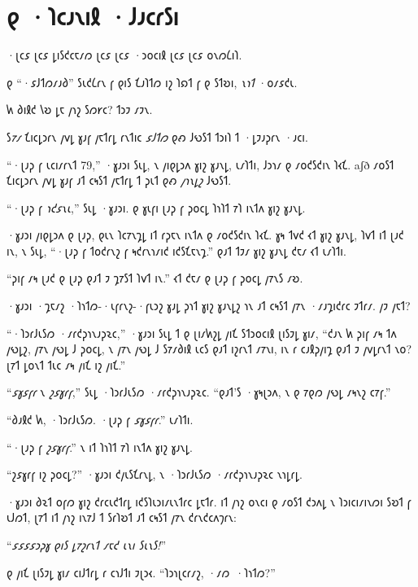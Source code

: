 \chapter{𐑞 ·𐑐𐑤𐑨𐑯𐑦𐑙 ·𐑓𐑨𐑤𐑩𐑕𐑦}

\begin{chapterOpeningAuthorNote}
    ·𐑚𐑤𐑭 𐑚𐑤𐑭 𐑛𐑦𐑕𐑒𐑤𐑱𐑥𐑼 𐑚𐑤𐑭 𐑚𐑤𐑭 ·𐑮𐑴𐑤𐑦𐑙 𐑚𐑤𐑭 𐑚𐑤𐑭 𐑴𐑯𐑼𐑖𐑦𐑐.

    𐑞 “·𐑭𐑓𐑑𐑼𐑥𐑨𐑔” 𐑕𐑧𐑒𐑖𐑩𐑯 𐑝 𐑞𐑦𐑕 𐑗𐑨𐑐𐑑𐑼 𐑦𐑟 𐑐𐑸𐑑 𐑝 𐑞 𐑕𐑑𐑹𐑦, \emph{𐑯𐑪𐑑} ·𐑴𐑥𐑭𐑒𐑧.
\end{chapterOpeningAuthorNote}
\begin{chapterOpeningQuote}
    𐑿 𐑔𐑦𐑙𐑒 𐑘𐑹 𐑛𐑱 𐑢𐑪𐑟 𐑕𐑼𐑾𐑤? 𐑑𐑮𐑲 𐑥𐑲𐑯.
\end{chapterOpeningQuote}

\lettrine{𐑕}{\emph{𐑳𐑥}} 𐑗𐑦𐑤𐑛𐑮𐑩𐑯 𐑢𐑫𐑛 𐑣𐑨𐑝 𐑢𐑱𐑑𐑩𐑛 𐑩𐑯𐑑𐑦𐑤 \emph{𐑭𐑓𐑑𐑼} 𐑞𐑺 𐑓𐑻𐑕𐑑 𐑑𐑮𐑦𐑐 𐑑 ·𐑛𐑲𐑨𐑜𐑩𐑯 ·𐑨𐑤𐑦.

“·𐑚𐑨𐑜 𐑝 𐑧𐑤𐑦𐑥𐑩𐑯𐑑 79,” ·𐑣𐑨𐑮𐑦 𐑕𐑧𐑛, 𐑯 𐑢𐑦𐑞𐑛𐑮𐑵 𐑣𐑦𐑟 𐑣𐑨𐑯𐑛, 𐑧𐑥𐑐𐑑𐑦, 𐑓𐑮𐑪𐑥 𐑞 𐑥𐑴𐑒𐑕𐑒𐑦𐑯 𐑐𐑬𐑗.
aʃð
𐑥𐑴𐑕𐑑 𐑗𐑦𐑤𐑛𐑮𐑩𐑯 𐑢𐑫𐑛 𐑣𐑨𐑝 𐑨𐑑 𐑤𐑰𐑕𐑑 𐑢𐑱𐑑𐑩𐑛 𐑑 𐑜𐑧𐑑 𐑞𐑺 \emph{𐑢𐑪𐑯𐑛𐑟} 𐑓𐑻𐑕𐑑.

“·𐑚𐑨𐑜 𐑝 \emph{𐑪𐑒𐑭𐑯𐑧},” 𐑕𐑧𐑛 ·𐑣𐑨𐑮𐑦. 𐑞 𐑣𐑧𐑝𐑦 𐑚𐑨𐑜 𐑝 𐑜𐑴𐑤𐑛 𐑐𐑪𐑐𐑑 𐑳𐑐 𐑦𐑯𐑑𐑵 𐑣𐑦𐑟 𐑣𐑨𐑯𐑛.

·𐑣𐑨𐑮𐑦 𐑢𐑦𐑞𐑛𐑮𐑵 𐑞 𐑚𐑨𐑜, 𐑞𐑧𐑯 𐑐𐑤𐑳𐑯𐑡𐑛 𐑦𐑑 𐑩𐑜𐑱𐑯 𐑦𐑯𐑑𐑵 𐑞 𐑥𐑴𐑒𐑕𐑒𐑦𐑯 𐑐𐑬𐑗. 𐑣𐑰 𐑑𐑫𐑒 𐑬𐑑 𐑣𐑦𐑟 𐑣𐑨𐑯𐑛, 𐑐𐑫𐑑 𐑦𐑑 𐑚𐑨𐑒 𐑦𐑯, 𐑯 𐑕𐑧𐑛, “·𐑚𐑨𐑜 𐑝 𐑑𐑴𐑒𐑩𐑯𐑟 𐑝 𐑰𐑒𐑩𐑯𐑪𐑥𐑦𐑒 𐑦𐑒𐑕𐑗𐑱𐑯𐑡.” 𐑞𐑨𐑑 𐑑𐑲𐑥 𐑣𐑦𐑟 𐑣𐑨𐑯𐑛 𐑒𐑱𐑥 𐑬𐑑 𐑧𐑥𐑐𐑑𐑦.

“𐑜𐑦𐑝 𐑥𐑰 𐑚𐑨𐑒 𐑞 𐑚𐑨𐑜 𐑞𐑨𐑑 𐑲 𐑡𐑳𐑕𐑑 𐑐𐑫𐑑 𐑦𐑯.” 𐑬𐑑 𐑒𐑱𐑥 𐑞 𐑚𐑨𐑜 𐑝 𐑜𐑴𐑤𐑛 𐑢𐑳𐑯𐑕 𐑥𐑹.

·𐑣𐑨𐑮𐑦 ·𐑡𐑱𐑥𐑟 ·𐑐𐑪𐑑𐑼-·𐑧𐑝𐑩𐑯𐑟-·𐑝𐑧𐑮𐑟 𐑣𐑨𐑛 𐑜𐑪𐑑 𐑣𐑦𐑟 𐑣𐑨𐑯𐑛𐑟 𐑪𐑯 𐑨𐑑 𐑤𐑰𐑕𐑑 𐑢𐑳𐑯 ·𐑥𐑨𐑡𐑦𐑒𐑩𐑤 𐑲𐑑𐑩𐑥. 𐑢𐑲 𐑢𐑱𐑑?

“·𐑐𐑮𐑩𐑓𐑧𐑕𐑼 ·𐑥𐑩𐑒𐑜𐑪𐑯𐑨𐑜𐑷𐑤,” ·𐑣𐑨𐑮𐑦 𐑕𐑧𐑛 𐑑 𐑞 𐑚𐑦𐑥𐑿𐑟𐑛 𐑢𐑦𐑗 𐑕𐑑𐑮𐑴𐑤𐑦𐑙 𐑚𐑦𐑕𐑲𐑛 𐑣𐑦𐑥, “𐑒𐑨𐑯 𐑿 𐑜𐑦𐑝 𐑥𐑰 𐑑𐑵 𐑢𐑻𐑛𐑟, 𐑢𐑳𐑯 𐑢𐑻𐑛 𐑓 𐑜𐑴𐑤𐑛, 𐑯 𐑢𐑳𐑯 𐑢𐑻𐑛 𐑓 𐑕𐑳𐑥𐑔𐑦𐑙 𐑧𐑤𐑕 𐑞𐑨𐑑 𐑦𐑟𐑩𐑯𐑑 𐑥𐑳𐑯𐑦, 𐑦𐑯 𐑩 𐑤𐑨𐑙𐑜𐑢𐑦𐑡 𐑞𐑨𐑑 𐑲 𐑢𐑫𐑛𐑩𐑯𐑑 𐑯𐑴? 𐑚𐑳𐑑 𐑛𐑴𐑯𐑑 𐑑𐑧𐑤 𐑥𐑰 𐑢𐑦𐑗 𐑦𐑟 𐑢𐑦𐑗.”

“\emph{𐑭𐑣𐑭𐑝𐑩} 𐑯 \emph{𐑟𐑭𐑣𐑩𐑝},” 𐑕𐑧𐑛 ·𐑐𐑮𐑩𐑓𐑧𐑕𐑼 ·𐑥𐑩𐑒𐑜𐑪𐑯𐑨𐑜𐑷𐑤. “𐑞𐑨𐑑'𐑕 ·𐑣𐑰𐑚𐑮𐑵, 𐑯 𐑞 𐑳𐑞𐑼 𐑢𐑻𐑛 𐑥𐑰𐑯𐑟 𐑤𐑳𐑝.”

“𐑔𐑨𐑙𐑒 𐑿, ·𐑐𐑮𐑩𐑓𐑧𐑕𐑼. ·𐑚𐑨𐑜 𐑝 \emph{𐑭𐑣𐑭𐑝𐑩}.” 𐑧𐑥𐑐𐑑𐑦.

“·𐑚𐑨𐑜 𐑝 \emph{𐑟𐑭𐑣𐑩𐑝}.” 𐑯 𐑦𐑑 𐑐𐑪𐑐𐑑 𐑳𐑐 𐑦𐑯𐑑𐑵 𐑣𐑦𐑟 𐑣𐑨𐑯𐑛.

“𐑟𐑭𐑣𐑩𐑝 𐑦𐑟 𐑜𐑴𐑤𐑛?” ·𐑣𐑨𐑮𐑦 𐑒𐑢𐑧𐑕𐑗𐑩𐑯𐑛, 𐑯 ·𐑐𐑮𐑩𐑓𐑧𐑕𐑼 ·𐑥𐑩𐑒𐑜𐑪𐑯𐑨𐑜𐑷𐑤 𐑯𐑪𐑛𐑩𐑛.

·𐑣𐑨𐑮𐑦 𐑔𐑷𐑑 𐑴𐑝𐑼 𐑣𐑦𐑟 𐑒𐑩𐑤𐑧𐑒𐑑𐑩𐑛 𐑦𐑒𐑕𐑐𐑧𐑮𐑦𐑥𐑧𐑯𐑑𐑩𐑤 𐑛𐑱𐑑𐑩. 𐑦𐑑 𐑢𐑪𐑟 𐑴𐑯𐑤𐑦 𐑞 𐑥𐑴𐑕𐑑 𐑒𐑮𐑵𐑛 𐑯 𐑐𐑮𐑦𐑤𐑦𐑥𐑦𐑯𐑼𐑦 𐑕𐑹𐑑 𐑝 𐑧𐑓𐑼𐑑, 𐑚𐑳𐑑 𐑦𐑑 𐑢𐑪𐑟 𐑦𐑯𐑳𐑓 𐑑 𐑕𐑩𐑐𐑹𐑑 𐑨𐑑 𐑤𐑰𐑕𐑑 𐑢𐑳𐑯 𐑒𐑩𐑯𐑒𐑤𐑵𐑠𐑩𐑯:

“\emph{𐑭𐑭𐑭𐑭𐑮𐑜𐑣 𐑞𐑦𐑕 𐑛𐑳𐑟𐑩𐑯𐑑 𐑥𐑱𐑒 𐑧𐑯𐑦 𐑕𐑧𐑯𐑕!}”

𐑞 𐑢𐑦𐑗 𐑚𐑦𐑕𐑲𐑛 𐑣𐑦𐑥 𐑤𐑦𐑓𐑑𐑩𐑛 𐑩 𐑤𐑪𐑓𐑑𐑦 𐑲𐑚𐑮𐑬. “𐑐𐑮𐑪𐑚𐑤𐑩𐑥𐑟, ·𐑥𐑼~·𐑐𐑪𐑑𐑼?”


